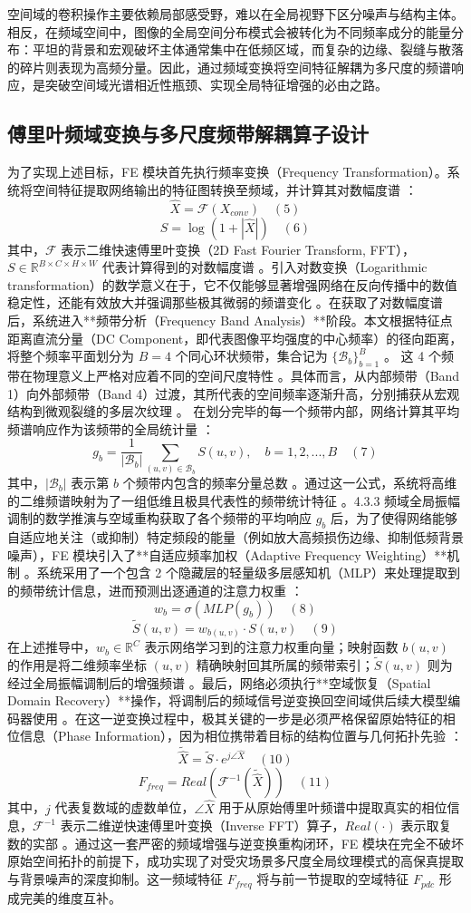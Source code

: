 空间域的卷积操作主要依赖局部感受野，难以在全局视野下区分噪声与结构主体。相反，在频域空间中，图像的全局空间分布模式会被转化为不同频率成分的能量分布：平坦的背景和宏观破坏主体通常集中在低频区域，而复杂的边缘、裂缝与散落的碎片则表现为高频分量。因此，通过频域变换将空间特征解耦为多尺度的频谱响应，是突破空间域光谱相近性瓶颈、实现全局特征增强的必由之路。

\subsection{傅里叶频域变换与多尺度频带解耦算子设计}
为了实现上述目标，FE 模块首先执行频率变换（Frequency Transformation）。系统将空间特征提取网络输出的特征图转换至频域，并计算其对数幅度谱 ：
$$\hat{X} = \mathcal{F}(X_{conv}) \quad (5)$$$$S = \log(1 + |\hat{X}|) \quad (6)$$其中，$\mathcal{F}$ 表示二维快速傅里叶变换（2D Fast Fourier Transform, FFT），$S \in \mathbb{R}^{B \times C \times H \times W}$ 代表计算得到的对数幅度谱 。引入对数变换（Logarithmic transformation）的数学意义在于，它不仅能够显著增强网络在反向传播中的数值稳定性，还能有效放大并强调那些极其微弱的频谱变化 。在获取了对数幅度谱后，系统进入**频带分析（Frequency Band Analysis）**阶段。本文根据特征点距离直流分量（DC Component，即代表图像平均强度的中心频率）的径向距离，将整个频率平面划分为 $B=4$ 个同心环状频带，集合记为 $\{\mathcal{B}_b\}_{b=1}^B$ 。
这 4 个频带在物理意义上严格对应着不同的空间尺度特性 。具体而言，从内部频带（Band 1）向外部频带（Band 4）过渡，其所代表的空间频率逐渐升高，分别捕获从宏观结构到微观裂缝的多层次纹理 。
在划分完毕的每一个频带内部，网络计算其平均频谱响应作为该频带的全局统计量 ：
$$g_b = \frac{1}{|\mathcal{B}_b|} \sum_{(u,v) \in \mathcal{B}_b} S(u,v), \quad b=1,2,...,B \quad (7)$$其中，$|\mathcal{B}_b|$ 表示第 $b$ 个频带内包含的频率分量总数 。通过这一公式，系统将高维的二维频谱映射为了一组低维且极具代表性的频带统计特征 。4.3.3 频域全局振幅调制的数学推演与空域重构获取了各个频带的平均响应 $g_b$ 后，为了使得网络能够自适应地关注（或抑制）特定频段的能量（例如放大高频损伤边缘、抑制低频背景噪声），FE 模块引入了**自适应频率加权（Adaptive Frequency Weighting）**机制 。系统采用了一个包含 2 个隐藏层的轻量级多层感知机（MLP）来处理提取到的频带统计信息，进而预测出逐通道的注意力权重 ：
$$w_b = \sigma(MLP(g_b)) \quad (8)$$$$\tilde{S}(u,v) = w_{b(u,v)} \cdot S(u,v) \quad (9)$$在上述推导中，$w_b \in \mathbb{R}^C$ 表示网络学习到的注意力权重向量；映射函数 $b(u,v)$ 的作用是将二维频率坐标 $(u,v)$ 精确映射回其所属的频带索引；$\tilde{S}(u,v)$ 则为经过全局振幅调制后的增强频谱 。最后，网络必须执行**空域恢复（Spatial Domain Recovery）**操作，将调制后的频域信号逆变换回空间域供后续大模型编码器使用 。在这一逆变换过程中，极其关键的一步是必须严格保留原始特征的相位信息（Phase Information），因为相位携带着目标的结构位置与几何拓扑先验 ：
$$\tilde{\hat{X}} = \tilde{S} \cdot e^{j \angle \hat{X}} \quad (10)$$$$F_{freq} = Real(\mathcal{F}^{-1}(\tilde{\hat{X}})) \quad (11)$$其中，$j$ 代表复数域的虚数单位，$\angle \hat{X}$ 用于从原始傅里叶频谱中提取真实的相位信息，$\mathcal{F}^{-1}$ 表示二维逆快速傅里叶变换（Inverse FFT）算子，$Real(\cdot)$ 表示取复数的实部 。通过这一套严密的频域增强与逆变换重构闭环，FE 模块在完全不破坏原始空间拓扑的前提下，成功实现了对受灾场景多尺度全局纹理模式的高保真提取与背景噪声的深度抑制。这一频域特征 $F_{freq}$ 将与前一节提取的空域特征 $F_{pdc}$ 形成完美的维度互补。

